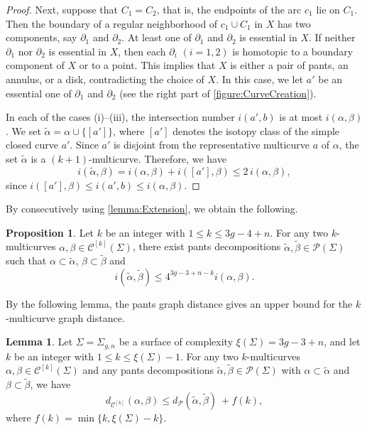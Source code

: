 \documentclass[a4paper,11pt]{amsart}
\numberwithin{equation}{section}
\theoremstyle{definition}
\newtheorem{proposition}[theorem]{Proposition}
\newtheorem{lemma}[theorem]{Lemma}
\newcommand{\multicurve}[1]{\mathcal{C}^{[#1]}}
\begin{document}
\begin{proof}
    Next, suppose that $C_1 = C_2$, that is, the endpoints of the arc $c_1$ lie on $C_1$.
    Then the boundary of a regular neighborhood of $c_1 \cup C_1$ in $X$ has two components, say $\partial_1$ and $\partial_2$.
    At least one of $\partial_1$ and $\partial_2$ is essential in $X$.
    If neither $\partial_1$ nor $\partial_2$ is essential in $X$, then each $\partial_i$ $(i=1,2)$ is homotopic to a boundary component of $X$ or to a point.
    This implies that $X$ is either a pair of pants, an annulus, or a disk, contradicting the choice of $X$.
    In this case, we let $a'$ be an essential one of $\partial_1$ and $\partial_2$ (see the right part of \cref{figure:CurveCreation}).

    In each of the cases (i)--(iii), the intersection number $i(a',b)$ is at most $i(\alpha,\beta)$.
    We set $\tilde{\alpha} = \alpha \cup \{[a']\}$, where $[a']$ denotes the isotopy class of the simple closed curve $a'$.
    Since $a'$ is disjoint from the representative multicurve $a$ of $\alpha$, the set $\tilde{\alpha}$ is a $(k+1)$-multicurve.
    Therefore, we have
    \begin{equation*}
        i(\tilde{\alpha},\beta)
        = i(\alpha,\beta) + i([a'],\beta)
        \le 2\, i(\alpha,\beta),
    \end{equation*}
    since $i([a'],\beta) \le i(a',b) \le i(\alpha,\beta)$.
\end{proof}

By consecutively using \cref{lemma:Extension}, we obtain the following.

\begin{proposition}\label{proposition:IntersectionlessExtension}
    Let $k$ be an integer with $1\leq k \leq 3g-4+n$.
    For any two $k$-multicurves $\alpha,\beta\in\multicurve{k}(\Sigma)$, there exist pants decompositions $\tilde{\alpha}, \tilde{\beta} \in \mathcal{P}(\Sigma)$ such that $\alpha\subset \tilde{\alpha}$, $\beta\subset \tilde{\beta}$ and 
    \begin{equation*}
        i(\tilde{\alpha},\tilde{\beta}) \leq 4^{3g-3+n-k} i(\alpha,\beta).
    \end{equation*}
\end{proposition}
By the following lemma, the pants graph distance gives an upper bound for the $k$-multicurve graph distance.

\begin{lemma}\label{lemma:UpperBoundForK-multicurveDistance}
Let $\Sigma=\Sigma_{g,n}$ be a surface of complexity $\xi(\Sigma)=3g-3+n$, and let $k$ be an integer with $1\le k\le \xi(\Sigma)-1$.
For any two $k$-multicurves $\alpha,\beta\in\multicurve{k}(\Sigma)$ and any pants decompositions
$\tilde{\alpha},\tilde{\beta}\in\mathcal{P}(\Sigma)$ with $\alpha\subset\tilde{\alpha}$ and $\beta\subset\tilde{\beta}$, we have
\begin{equation*}
    d_{\multicurve{k}}(\alpha,\beta)\leq d_{\mathcal{P}}(\tilde{\alpha},\tilde{\beta})\ +f(k),
\end{equation*}
where $f(k)=\min\{k, \xi(\Sigma)-k\}$.

\end{lemma}
\end{document}
